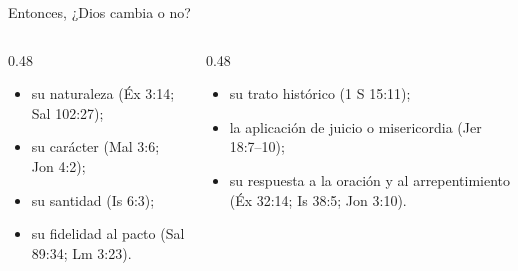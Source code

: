 \begin{frame}{Entonces, ¿Dios cambia o no?}
\begin{columns}[t,onlytextwidth]
\begin{column}{0.48\textwidth}
\begin{tcolorbox}[colback=papiro,colframe=azul,boxrule=1pt,arc=3pt,title={\small Dios NO cambia en},colbacktitle=azul,coltitle=papiro]
\small
\begin{itemize}
\item su naturaleza (Éx 3:14; Sal 102:27);
\item su carácter (Mal 3:6; Jon 4:2);
\item su santidad (Is 6:3);
\item su fidelidad al pacto (Sal 89:34; Lm 3:23).
\end{itemize}
\end{tcolorbox}
\end{column}
\begin{column}{0.48\textwidth}
\begin{tcolorbox}[colback=papiro,colframe=dorado,boxrule=1pt,arc=3pt,title={\small Dios SÍ cambia en},colbacktitle=dorado,coltitle=azuloscuro]
\small
\begin{itemize}
\item su trato histórico (1 S 15:11);
\item la aplicación de juicio o misericordia (Jer 18:7--10);
\item su respuesta a la oración y al arrepentimiento (Éx 32:14; Is 38:5; Jon 3:10).
\end{itemize}
\end{tcolorbox}
\end{column}
\end{columns}\par\medskip
\centering{}
\end{frame}

